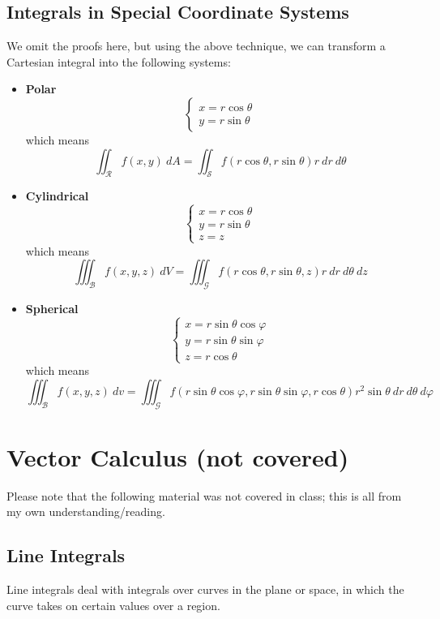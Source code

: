 \documentclass[12pt]{article}
\begin{document}
\subsection{Integrals in Special Coordinate Systems}
We omit the proofs here, but using the above technique, we can transform a Cartesian integral into the following systems:
\begin{itemize}
\item \textbf{Polar} \[ \begin{cases} x = r\cos{\theta} \\ y = r\sin{\theta} \end{cases} \] which means \[ \iint_{\mathcal{R}}f(x,y) \ dA = \iint_{\mathcal{S}}f(r\cos{\theta},r\sin{\theta}) r \ dr \ d\theta\]
\item \textbf{Cylindrical} \[ \begin{cases} x = r\cos{\theta} \\ y = r\sin{\theta} \\ z = z \end{cases} \] which means \[ \iiint_{\mathcal{B}} f(x,y,z) \ dV = \iiint_{\mathcal{G}}f(r\cos{\theta},r\sin{\theta},z) r \ dr \ d\theta \ dz \]
\item \textbf{Spherical} \[ \begin{cases} x = r\sin{\theta}\cos{\varphi} \\ y = r\sin{\theta}\sin{\varphi} \\ z = r\cos{\theta} \end{cases} \] which means \[ \iiint_{\mathcal{B}} f(x,y,z) \ dv = \iiint_{\mathcal{G}}f(r\sin{\theta}\cos{\varphi},r\sin{\theta}\sin{\varphi},r\cos{\theta}) r^2\sin{\theta} \ dr \ d\theta \ d\varphi \]
\end{itemize}
\section{Vector Calculus (not covered)} %
Please note that the following material was not covered in class; this is all from my own understanding/reading.

\subsection{Line Integrals}
Line integrals deal with integrals over curves in the plane or space, in which the curve takes on certain values over a region. 
\end{document}
